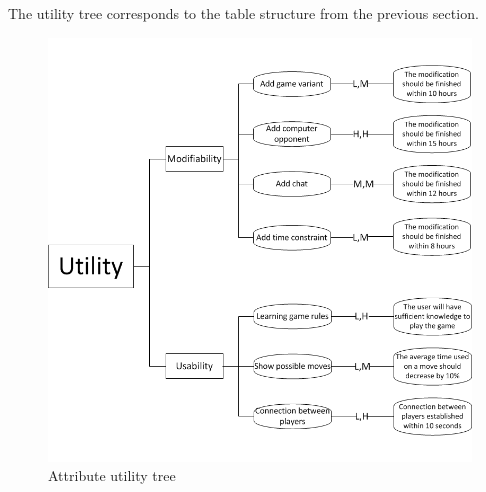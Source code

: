 The utility tree corresponds to the table structure from the previous section.

\begin{figure}[H]
\includegraphics[width=1\textwidth]{Images/utility}
\caption{Attribute utility tree}
\end{figure}




